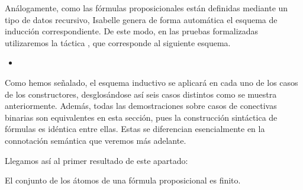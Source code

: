 \begin{isabellebody}
\begin{isamarkuptext}
  Análogamente, como las fórmulas proposicionales están definidas 
  mediante un tipo de datos recursivo, Isabelle genera de forma 
  automática el esquema de inducción correspondiente. De este modo, en 
  las pruebas formalizadas utilizaremos la táctica , 
  que corresponde al siguiente esquema.


  \begin{itemize}
    \item[] 
  \end{itemize} 

  Como hemos señalado, el esquema inductivo se aplicará en cada uno de 
  los casos de los constructores, desglosándose así seis casos distintos 
  como se muestra anteriormente. Además, todas las demostraciones sobre 
  casos de conectivas binarias son equivalentes en esta sección, pues la 
  construcción sintáctica de fórmulas es idéntica entre ellas. Estas se 
  diferencian esencialmente en la connotación semántica que veremos más 
  adelante.

  Llegamos así al primer resultado de este apartado:

  \begin{lema}
    El conjunto de los átomos de una fórmula proposicional es finito.
  \end{lema}


\end{isamarkuptext}
\end{isabellebody}
